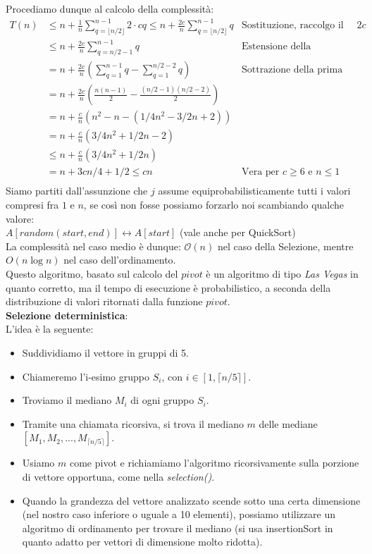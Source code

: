 \documentclass[../cheatSheetAlgoritmi.tex]{subfiles}
\begin{document}
Procediamo dunque al calcolo della complessità:
\begin{align*}
	 T(n) & \leq n + \frac{1}{n} \sum_{q = \lfloor n/2 \rfloor}^{n-1} 2  \cdot cq \leq n + \frac{2c}{n} \sum_{q = \lfloor n/2 \rfloor}^{n-1} q & \text{Sostituzione, raccolgo il fattore $2c$} \\
	& \leq n + \frac{2c}{n} \sum_{q = n/2 - 1}^{n-1} q & \text{Estensione della sommatoria} \\
	& = n + \frac{2c}{n} \left( \sum_{q = 1}^{n-1} q -  \sum_{q = 1}^{n/2 - 2} q \right) & \text{Sottrazione della prima parte} \\
	& = n + \frac{2c}{n} \left( \frac{n (n - 1)}{2} - \frac{(n/2 - 1)(n/2 - 2)}{2}\right) &\\
	& = n + \frac{c}{n} \left(n^2 - n - (1/4 n^2 - 3/2n + 2) \right) & \\
	& = n + \frac{c}{n} \left(3/4n^2 + 1/2 n - 2 \right) & \\
	& \leq n + \frac{c}{n} \left(3/4n^2 + 1/2 n \right) & \\
	& = n + 3cn/4 +1/2 \leq cn & \text{Vera per $c \geq 6$ e $n \leq 1$} \\
\end{align*}
Siamo partiti dall’assunzione che $j$ assume equiprobabilisticamente tutti i valori compresi fra $1$ e $n$, se così non fosse possiamo forzarlo noi scambiando qualche valore: \\
$A[random(start,end)] \leftrightarrow A[start]$ (vale anche per QuickSort)\\
La complessità nel caso medio è dunque: $\mathcal{O}(n)$ nel caso della Selezione, mentre $O(n \log n)$ nel caso dell'ordinamento. \\
Questo algoritmo, basato sul calcolo del $pivot$ è un algoritmo di tipo \emph{Las Vegas} in quanto corretto, ma il tempo di esecuzione è probabilistico, a seconda della distribuzione di valori ritornati dalla funzione $pivot$. \\
\textbf{Selezione deterministica}: \\
L'idea è la seguente:
\begin{itemize}
	\item Suddividiamo il vettore in gruppi di 5.
	\item Chiameremo l’i-esimo gruppo $S_i$, con $i \in [1, \lceil n/5 \rceil]$. 
	\item Troviamo il mediano $M_i$ di ogni gruppo $S_i$. 
	\item Tramite una chiamata ricorsiva, si trova il mediano $m$ delle mediane $[M_1,M_2,...,M_{\lceil n/5 \rceil}]$. 
	\item Usiamo $m$ come pivot e richiamiamo l'algoritmo ricorsivamente sulla porzione di vettore opportuna, come nella \emph{selection()}.
	\item Quando la grandezza del vettore analizzato scende sotto una certa dimensione (nel nostro caso inferiore o uguale a 10 elementi), possiamo utilizzare un algoritmo di ordinamento per trovare il mediano (si usa insertionSort in quanto adatto per vettori di dimensione molto ridotta).
\end{itemize}
\end{document}
